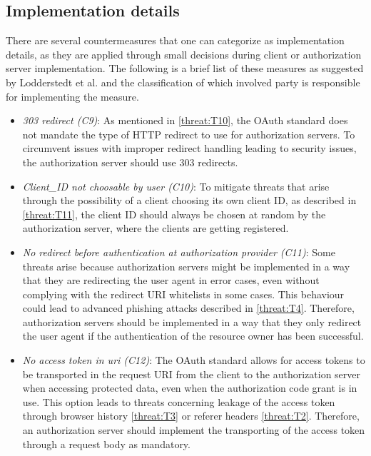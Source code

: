\documentclass[
    fontsize=12pt,
    headings=small,
    parskip=half,           %
    bibliography=totoc,
    numbers=noenddot,       %
    open=any,               %
    ]{scrreprt}
\begin{document}
\subsection{Implementation details}
\label{counter:C9_10_11_12_13_14}

There are several countermeasures that one can categorize as implementation details, as they are applied through small decisions during client or authorization server implementation. The following is a brief list of these measures as suggested by Lodderstedt et al. \cite{lodderstedt2020oauth} and the classification of which involved party is responsible for implementing the measure.
\begin{itemize}

\item \emph{303 redirect (C9)}: As mentioned in \ref{threat:T10}, the OAuth standard does not mandate the type of HTTP redirect to use for authorization servers. To circumvent issues with improper redirect handling leading to security issues, the authorization server should use 303 redirects.

\item \emph{Client\_ID not choosable by user (C10)}: To mitigate threats that arise through the possibility of a client choosing its own client ID, as described in \ref{threat:T11}, the client ID should always be chosen at random by the authorization server, where the clients are getting registered.

\item \emph{No redirect before authentication at authorization provider (C11)}: Some threats arise because authorization servers might be implemented in a way that they are redirecting the user agent in error cases, even without complying with the redirect URI whitelists in some cases. This behaviour could lead to advanced phishing attacks described in \ref{threat:T4}. Therefore, authorization servers should be implemented in a way that they only redirect the user agent if the authentication of the resource owner has been successful.

\item \emph{No access token in uri (C12)}: The OAuth standard allows for access tokens to be transported in the request URI from the client to the authorization server when accessing protected data, even when the authorization code grant is in use. This option leads to threats concerning leakage of the access token through browser history \ref{threat:T3} or referer headers \ref{threat:T2}. Therefore, an authorization server should implement the transporting of the access token through a request body as mandatory.


\end{itemize}
\end{document}
